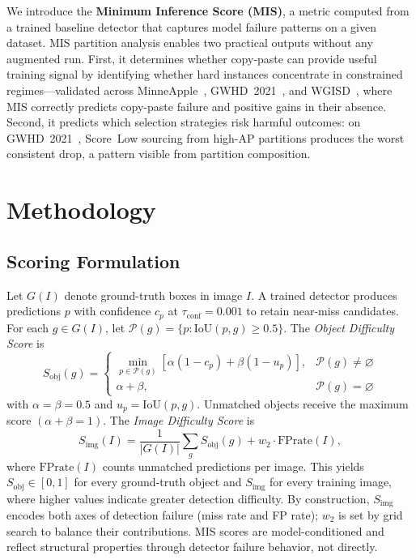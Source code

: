 \documentclass[conference]{IEEEtran}
\begin{document}
We introduce the \textbf{Minimum Inference Score (MIS)}, a
metric computed from a trained baseline detector that captures
model failure patterns on a given dataset.
MIS partition analysis enables two practical outputs without
any augmented run.
First, it determines whether copy-paste can provide useful
training signal by identifying whether hard instances
concentrate in constrained regimes---validated across
MinneApple~\cite{hani2020minneapple},
GWHD~2021~\cite{david2021global}, and
WGISD~\cite{santos2020grape}, where MIS correctly predicts
copy-paste failure and positive gains in their absence.
Second, it predicts which selection strategies risk harmful
outcomes: on GWHD~2021~\cite{david2021global}, Score~Low sourcing from high-AP
partitions produces the worst consistent drop, a pattern
visible from partition composition.


\section{Methodology}
\subsection{Scoring Formulation}

Let $G(I)$ denote ground-truth boxes in image $I$.
A trained detector produces predictions $p$ with confidence $c_p$ at
$\tau_{\mathrm{conf}}{=}0.001$ to retain near-miss candidates.
For each $g\in G(I)$, let
$\mathcal{P}(g){=}\{p:\mathrm{IoU}(p,g){\ge}0.5\}$.
The \textit{Object Difficulty Score} is
\begin{equation}
S_{\mathrm{obj}}(g) =
\begin{cases}
  \min_{p \in \mathcal{P}(g)}\!
    [\alpha(1{-}c_p) + \beta(1{-}u_p)],
    & \mathcal{P}(g) \neq \varnothing \\[2pt]
  \alpha + \beta, & \mathcal{P}(g) = \varnothing
\end{cases}
\label{eq:obj}
\end{equation}
with $\alpha{=}\beta{=}0.5$ and $u_p{=}\mathrm{IoU}(p,g)$.
Unmatched objects receive the maximum score $(\alpha{+}\beta{=}1)$.
The \textit{Image Difficulty Score} is
\begin{equation}
S_{\mathrm{img}}(I)
  = \frac{1}{|G(I)|}\sum_{g} S_{\mathrm{obj}}(g)
  + w_2 \cdot \mathrm{FPrate}(I),
\label{eq:img}
\end{equation}
where $\mathrm{FPrate}(I)$ counts unmatched predictions per image.
This yields $S_{\mathrm{obj}} \in [0,1]$ for every ground-truth object
and $S_{\mathrm{img}}$ for every training image, where higher values
indicate greater detection difficulty.
By construction, $S_{\mathrm{img}}$ encodes both axes of detection
failure (miss rate and FP rate); $w_2$ is set by grid search to
balance their contributions.
MIS scores are model-conditioned and reflect structural
properties through detector failure behavior, not directly.
\end{document}
